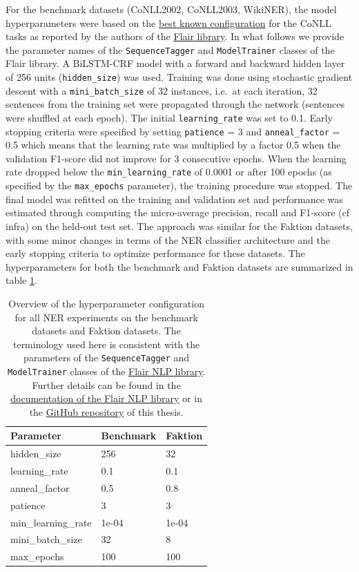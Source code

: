 \documentclass[12pt,a4paper,]{book}
\begin{document}
For the benchmark datasets (CoNLL2002, CoNLL2003, WikiNER), the model hyperparameters were based on the \href{https://github.com/flairNLP/flair/blob/master/resources/docs/EXPERIMENTS.md}{best known configuration} for the CoNLL tasks as reported by the authors of the \href{https://github.com/flairNLP/flair}{Flair library}. In what follows we provide the parameter names of the \texttt{SequenceTagger} and \texttt{ModelTrainer} classes of the Flair library. A BiLSTM-CRF model with a forward and backward hidden layer of 256 units (\texttt{hidden\_size}) was used. Training was done using stochastic gradient descent with a \texttt{mini\_batch\_size} of 32 instances, i.e.~at each iteration, 32 sentences from the training set were propagated through the network (sentences were shuffled at each epoch). The initial \texttt{learning\_rate} was set to 0.1. Early stopping criteria were specified by setting \texttt{patience} = 3 and \texttt{anneal\_factor} = 0.5 which means that the learning rate was multiplied by a factor 0.5 when the validation F1-score did not improve for 3 consecutive epochs. When the learning rate dropped below the \texttt{min\_learning\_rate} of 0.0001 or after 100 epochs (as specified by the \texttt{max\_epochs} parameter), the training procedure was stopped. The final model was refitted on the training and validation set and performance was estimated through computing the micro-average precision, recall and F1-score (cf infra) on the held-out test set. The approach was similar for the Faktion datasets, with some minor changes in terms of the NER classifier architecture and the early stopping criteria to optimize performance for these datasets. The hyperparameters for both the benchmark and Faktion datasets are summarized in table \ref{tab:params}.

\begin{table}

\caption{\label{tab:params}Overview of the hyperparameter configuration for all NER experiments on the benchmark datasets and Faktion datasets. The terminology used here is consistent with the parameters of the \texttt{SequenceTagger} and \texttt{ModelTrainer} classes of the \href{https://github.com/flairNLP/flair}{Flair NLP library}. Further details can be found in the \href{https://github.com/flairNLP/flair/tree/master/resources/docs}{documentation of the Flair NLP library} or in the \href{https://github.com/arthur-arthur/NER/}{GitHub repository} of this thesis.}
\centering
\begin{tabular}[t]{lll}
\toprule
Parameter & Benchmark & Faktion\\
\midrule
hidden\_size & 256 & 32\\
learning\_rate & 0.1 & 0.1\\
anneal\_factor & 0.5 & 0.8\\
patience & 3 & 3\\
min\_learning\_rate & 1e-04 & 1e-04\\
\addlinespace
mini\_batch\_size & 32 & 8\\
max\_epochs & 100 & 100\\
\bottomrule
\end{tabular}
\end{table}
\end{document}
